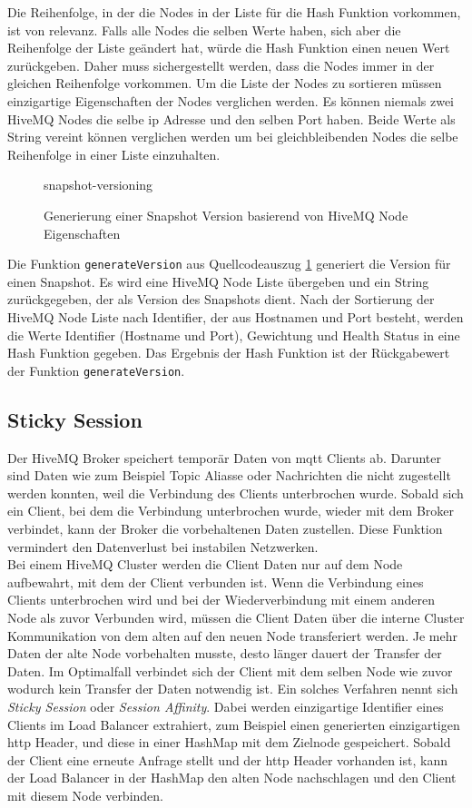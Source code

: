 Die Reihenfolge, in der die Nodes in der Liste für die Hash Funktion vorkommen, ist von relevanz. Falls alle Nodes die selben Werte haben, sich aber die Reihenfolge der Liste geändert hat, würde die Hash Funktion einen neuen Wert zurückgeben. Daher muss sichergestellt werden, dass die Nodes immer in der gleichen Reihenfolge vorkommen. Um die Liste der Nodes zu sortieren müssen einzigartige Eigenschaften der Nodes verglichen werden.
Es können niemals zwei HiveMQ Nodes die selbe \ac{ip} Adresse und den selben Port haben. Beide Werte als String vereint können verglichen werden um bei gleichbleibenden Nodes die selbe Reihenfolge in einer Liste einzuhalten.

\begin{figure}
    {snapshot-versioning}
    \caption{Generierung einer Snapshot Version basierend von HiveMQ Node Eigenschaften}
    \label{code:snapshot-versioning}
\end{figure}
Die Funktion \verb|generateVersion| aus Quellcodeauszug \ref{code:snapshot-versioning} generiert die Version für einen Snapshot. Es wird eine HiveMQ Node Liste übergeben und ein String zurückgegeben, der als Version des Snapshots dient. Nach der Sortierung der HiveMQ Node Liste nach Identifier, der aus Hostnamen und Port besteht, werden die Werte Identifier (Hostname und Port), Gewichtung und Health Status in eine Hash Funktion gegeben. Das Ergebnis der Hash Funktion ist der Rückgabewert der Funktion \verb|generateVersion|.

\subsection{Sticky Session}
Der HiveMQ Broker speichert temporär Daten von \ac{mqtt} Clients ab. Darunter sind Daten wie zum Beispiel Topic Aliasse oder Nachrichten die nicht zugestellt werden konnten, weil die Verbindung des Clients unterbrochen wurde. Sobald sich ein Client, bei dem die Verbindung unterbrochen wurde, wieder mit dem Broker verbindet, kann der Broker die vorbehaltenen Daten zustellen. Diese Funktion vermindert den Datenverlust bei instabilen Netzwerken.
\\
Bei einem HiveMQ Cluster werden die Client Daten nur auf dem Node aufbewahrt, mit dem der Client verbunden ist. Wenn die Verbindung eines Clients unterbrochen wird und bei der Wiederverbindung mit einem anderen Node als zuvor Verbunden wird, müssen die Client Daten über die interne Cluster Kommunikation von dem alten auf den neuen Node transferiert werden. Je mehr Daten der alte Node vorbehalten musste, desto länger dauert der Transfer der Daten.
Im Optimalfall verbindet sich der Client mit dem selben Node wie zuvor wodurch kein Transfer der Daten notwendig ist.
Ein solches Verfahren nennt sich \textit{Sticky Session} oder \textit{Session Affinity}. Dabei werden einzigartige Identifier eines Clients im Load Balancer extrahiert, zum Beispiel einen generierten einzigartigen \ac{http} Header, und diese in einer HashMap mit dem Zielnode gespeichert. Sobald der Client eine erneute Anfrage stellt und der \ac{http} Header vorhanden ist, kann der Load Balancer in der HashMap den alten Node nachschlagen und den Client mit diesem Node verbinden. %

